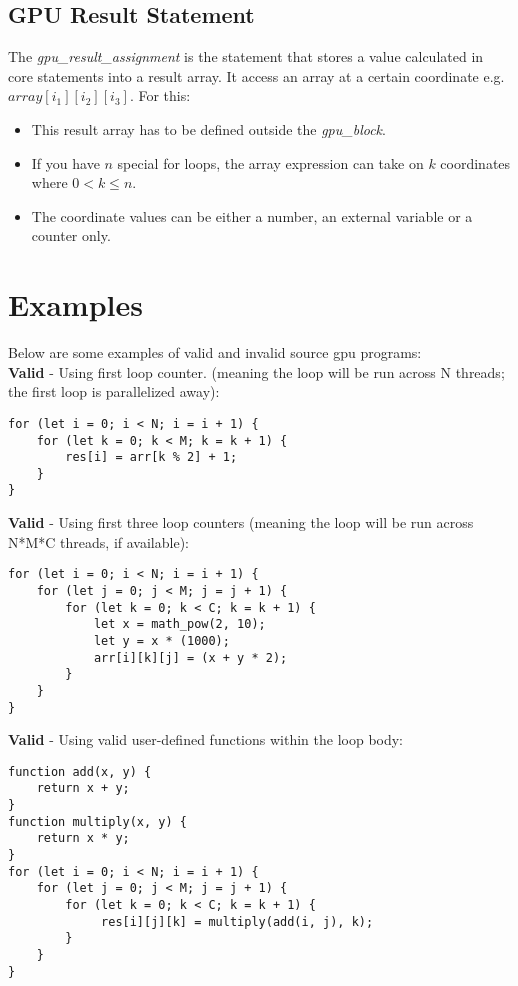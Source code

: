 \subsection*{GPU Result Statement}

The \textit{gpu\_result\_assignment} is the statement that stores a value calculated in core statements into a result array. 
It access an array at a certain coordinate e.g. ${array[{i_1}][{i_2}][{i_3}]}$. For this: 

\begin{itemize}
    \item{This result array has to be defined outside the \textit{gpu\_block}.}
    \item{ If you have ${n}$ special for loops, the array expression can take on ${k}$ coordinates where ${0 < k \leq n}$.} 
    \item{ The coordinate values can be either a number, an external variable or a counter only. }
\end{itemize}

\section*{Examples}

Below are some examples of valid and invalid source gpu programs:\\

\textbf{Valid} - Using first loop counter. (meaning the loop will be run across N threads; the first loop is parallelized away):
\begin{verbatim}
for (let i = 0; i < N; i = i + 1) {
    for (let k = 0; k < M; k = k + 1) {
        res[i] = arr[k % 2] + 1;
    }
}
\end{verbatim}

\textbf{Valid} - Using first three loop counters (meaning the loop will be run across N*M*C threads, if available):
\begin{verbatim}
for (let i = 0; i < N; i = i + 1) {
    for (let j = 0; j < M; j = j + 1) {
        for (let k = 0; k < C; k = k + 1) {
            let x = math_pow(2, 10);
            let y = x * (1000);
            arr[i][k][j] = (x + y * 2);
        }
    }
}
\end{verbatim}

\textbf{Valid} - Using valid user-defined functions within the loop body:
\begin{verbatim}
function add(x, y) {
    return x + y;
}
function multiply(x, y) {
    return x * y;
}
for (let i = 0; i < N; i = i + 1) {
    for (let j = 0; j < M; j = j + 1) {
        for (let k = 0; k < C; k = k + 1) {
             res[i][j][k] = multiply(add(i, j), k);
        }
    }
}
\end{verbatim}

